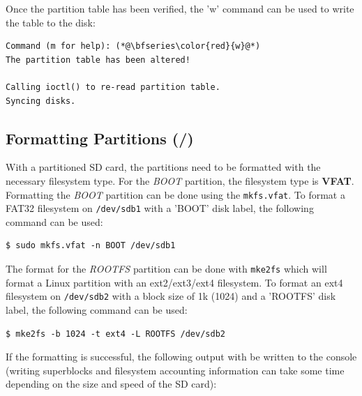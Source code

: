 Once the partition table has been verified, the 'w' command can be used to write the table to the disk:


\begin{lstlisting}[style=text]
Command (m for help): (*@\bfseries\color{red}{w}@*)
The partition table has been altered!

Calling ioctl() to re-read partition table.
Syncing disks.
\end{lstlisting}


\subsection{Formatting Partitions (/)}
With a partitioned SD card, the partitions need to be formatted with the necessary filesystem type. For the \textit{BOOT} partition, the filesystem type is \textbf{VFAT}. Formatting the \textit{BOOT} partition can be done using the \texttt{mkfs.vfat}. To format a FAT32 filesystem on \texttt{/dev/sdb1} with a 'BOOT' disk label, the following command can be used:


\begin{lstlisting}
$ sudo mkfs.vfat -n BOOT /dev/sdb1
\end{lstlisting}


The format for the \textit{ROOTFS} partition can be done with \texttt{mke2fs} which will format a Linux partition with an ext2/ext3/ext4 filesystem. To format an ext4 filesystem on \texttt{/dev/sdb2} with a block size of 1k (1024) and a 'ROOTFS' disk label, the following command can be used:



\begin{lstlisting}
$ mke2fs -b 1024 -t ext4 -L ROOTFS /dev/sdb2
\end{lstlisting}


If the formatting is successful, the following output with be written to the console (writing superblocks and filesystem accounting information can take some time depending on the size and speed of the SD card):



